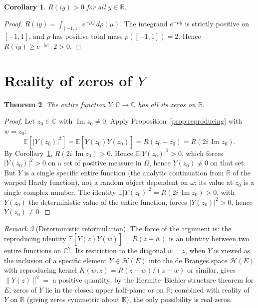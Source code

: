 \documentclass[11pt]{article}
\newtheorem{theorem}{Theorem}
\newtheorem{corollary}[theorem]{Corollary}
\theoremstyle{definition}
\theoremstyle{remark}
\newtheorem{remark}[theorem]{Remark}
\newcommand{\R}{\mathbb{R}}
\newcommand{\C}{\mathbb{C}}
\newcommand{\E}{\mathbb{E}}
\DeclareMathOperator{\Imag}{Im}
\begin{document}
\begin{corollary}\label{cor:Rpositive}
$R(iy) > 0$ for all $y \in \R$.
\end{corollary}

\begin{proof}
$R(iy) = \int_{[-1,1]} e^{-\mu y}\, d\rho(\mu)$. The integrand $e^{-\mu y}$ is strictly positive on $[-1,1]$, and $\rho$ has positive total mass $\rho([-1,1]) = 2$. Hence $R(iy) \geq e^{-|y|}\cdot 2 > 0$.
\end{proof}

\section{Reality of zeros of $Y$}

\begin{theorem}\label{thm:Yreal}
The entire function $Y: \C \to \C$ has all its zeros on $\R$.
\end{theorem}

\begin{proof}
Let $z_0 \in \C$ with $\Imag z_0 \neq 0$. Apply Proposition~\ref{prop:reproducing} with $w = z_0$:
\[
\E\!\left[|Y(z_0)|^2\right] = \E[Y(z_0)\overline{Y(z_0)}] = R(z_0 - \overline{z_0}) = R(2i\,\Imag z_0).
\]
By Corollary~\ref{cor:Rpositive}, $R(2i\,\Imag z_0) > 0$. Hence $\E|Y(z_0)|^2 > 0$, which forces $|Y(z_0)|^2 > 0$ on a set of positive measure in $\Omega$, hence $Y(z_0) \neq 0$ on that set. But $Y$ is a single specific entire function (the analytic continuation from $\R$ of the warped Hardy function), not a random object dependent on $\omega$; its value at $z_0$ is a single complex number. The identity $\E|Y(z_0)|^2 = R(2i\,\Imag z_0) > 0$, with $Y(z_0)$ the deterministic value of the entire function, forces $|Y(z_0)|^2 > 0$, hence $Y(z_0) \neq 0$.
\end{proof}

\begin{remark}[Deterministic reformulation]\label{rem:deterministic}
The force of the argument is: the reproducing identity $\E[Y(z)\overline{Y(w)}] = R(z-\overline w)$ is an identity between two entire functions on $\C^2$. Its restriction to the diagonal $w = z$, when $Y$ is viewed as the inclusion of a specific element $Y \in \mathcal H(E)$ into the de Branges space $\mathcal H(E)$ with reproducing kernel $K(w,z) = R(z-\overline w)/(z-\overline w)$ or similar, gives $\|Y(z)\|^2 = $ a positive quantity; by the Hermite--Biehler structure theorem for $E$, zeros of $Y$ lie in the closed upper half-plane or on $\R$; combined with reality of $Y$ on $\R$ (giving zeros symmetric about $\R$), the only possibility is real zeros.
\end{remark}
\end{document}
